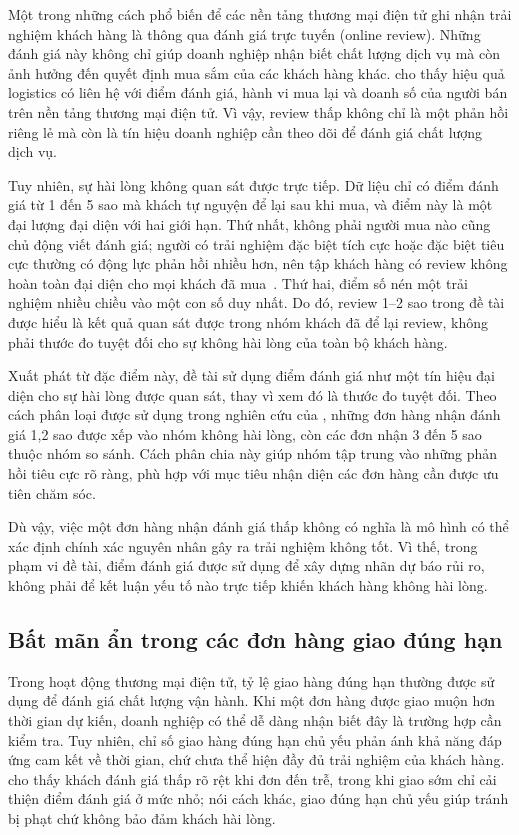 \documentclass[12pt,a4paper]{report}
\begin{document}
Một trong những cách phổ biến để các nền tảng thương mại điện tử ghi nhận trải nghiệm khách hàng là thông qua đánh giá trực tuyến (online review). Những đánh giá này không chỉ giúp doanh nghiệp nhận biết chất lượng dịch vụ mà còn ảnh hưởng đến quyết định mua sắm của các khách hàng khác.  \textcite{deshpande2023} cho thấy hiệu quả logistics có liên hệ với điểm đánh giá, hành vi mua lại và doanh số của người bán trên nền tảng thương mại điện tử. Vì vậy, review thấp không chỉ là một phản hồi riêng lẻ mà còn là tín hiệu doanh nghiệp cần theo dõi để đánh giá chất lượng dịch vụ.

Tuy nhiên, sự hài lòng không quan sát được trực tiếp. Dữ liệu chỉ có điểm đánh giá từ 1 đến 5 sao mà khách tự nguyện để lại sau khi mua, và điểm này là một đại lượng đại diện với hai giới hạn. Thứ nhất, không phải người mua nào cũng chủ động viết đánh giá; người có trải nghiệm đặc biệt tích cực hoặc đặc biệt tiêu cực thường có động lực phản hồi nhiều hơn, nên tập khách hàng có review không hoàn toàn đại diện cho mọi khách đã mua~\parencite{li2008,schoenmueller2020}. Thứ hai, điểm số nén một trải nghiệm nhiều chiều vào một con số duy nhất. Do đó, review 1--2 sao trong đề tài được hiểu là kết quả quan sát được trong nhóm khách đã để lại review, không phải thước đo tuyệt đối cho sự không hài lòng của toàn bộ khách hàng.

Xuất phát từ đặc điểm này, đề tài sử dụng điểm đánh giá như một tín hiệu đại diện cho sự hài lòng được quan sát, thay vì xem đó là thước đo tuyệt đối. Theo cách phân loại được sử dụng trong nghiên cứu của \textcite{orman2026}, những đơn hàng nhận đánh giá 1,2 sao được xếp vào nhóm không hài lòng, còn các đơn nhận 3 đến 5 sao thuộc nhóm so sánh. Cách phân chia này giúp nhóm tập trung vào những phản hồi tiêu cực rõ ràng, phù hợp với mục tiêu nhận diện các đơn hàng cần được ưu tiên chăm sóc.

Dù vậy, việc một đơn hàng nhận đánh giá thấp không có nghĩa là mô hình có thể xác định chính xác nguyên nhân gây ra trải nghiệm không tốt. Vì thế, trong phạm vi đề tài, điểm đánh giá được sử dụng để xây dựng nhãn dự báo rủi ro, không phải để kết luận yếu tố nào trực tiếp khiến khách hàng không hài lòng.

\subsection{Bất mãn ẩn trong các đơn hàng giao đúng hạn}\label{sec:con-hidden}

Trong hoạt động thương mại điện tử, tỷ lệ giao hàng đúng hạn thường được sử dụng để đánh giá chất lượng vận hành. Khi một đơn hàng được giao muộn hơn thời gian dự kiến, doanh nghiệp có thể dễ dàng nhận biết đây là trường hợp cần kiểm tra. Tuy nhiên, chỉ số giao hàng đúng hạn chủ yếu phản ánh khả năng đáp ứng cam kết về thời gian, chứ chưa thể hiện đầy đủ trải nghiệm của khách hàng. \textcite{ravula2023} cho thấy khách đánh giá thấp rõ rệt khi đơn đến trễ, trong khi giao sớm chỉ cải thiện điểm đánh giá ở mức nhỏ; nói cách khác, giao đúng hạn chủ yếu giúp tránh bị phạt chứ không bảo đảm khách hài lòng.
\end{document}
